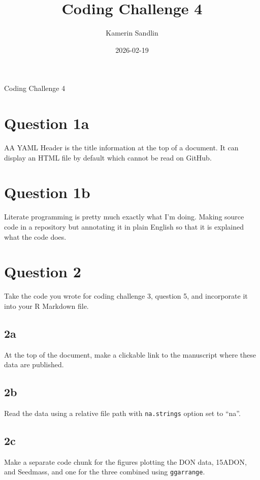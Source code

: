 \documentclass[
]{article}
\title{Coding Challenge 4}
\author{Kamerin Sandlin}
\date{2026-02-19}
\begin{document}
\maketitle

{
\setcounter{tocdepth}{2}
\tableofcontents
}
Coding Challenge 4

\section{Question 1a}\label{question-1a}

AA YAML Header is the title information at the top of a document. It can
display an HTML file by default which cannot be read on GitHub.

\section{Question 1b}\label{question-1b}

Literate programming is pretty much exactly what I'm doing. Making
source code in a repository but annotating it in plain English so that
it is explained what the code does.

\section{Question 2}\label{question-2}

Take the code you wrote for coding challenge 3, question 5, and
incorporate it into your R Markdown file.

\subsection{2a}\label{a}

At the top of the document, make a clickable link to the manuscript
where these data are published.

\subsection{2b}\label{b}

Read the data using a relative file path with \texttt{na.strings} option
set to ``na''.

\subsection{2c}\label{c}

Make a separate code chunk for the figures plotting the DON data,
15ADON, and Seedmass, and one for the three combined using
\texttt{ggarrange}.
\end{document}
